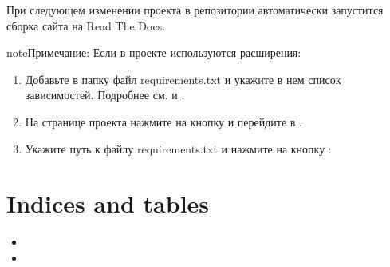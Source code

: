 \documentclass[letterpaper,12pt,russian]{sphinxmanual}
\begin{document}
При следующем изменении проекта в репозитории автоматически запустится сборка сайта на Read The Docs.

\begin{sphinxadmonition}{note}{Примечание:}
Если в проекте используются расширения:
\begin{enumerate}
%
\item {} 
Добавьте в папку  файл requirements.txt и укажите в нем список зависимостей. Подробнее см.  и  .

\item {} 
На странице проекта нажмите на кнопку  и перейдите в .

\item {} 
Укажите путь к файлу requirements.txt и нажмите на кнопку :

\end{enumerate}

\end{sphinxadmonition}









\chapter{Indices and tables}
\label{\detokenize{index:indices-and-tables}}\begin{itemize}
\item {} 

\item {} 

\end{itemize}



\renewcommand{\indexname}{Алфавитный указатель}
\printindex
\end{document}

